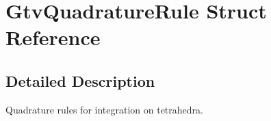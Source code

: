 \section{GtvQuadratureRule Struct Reference}
\label{structGtvQuadratureRule}


\subsection{Detailed Description}
Quadrature rules for integration on tetrahedra. 

